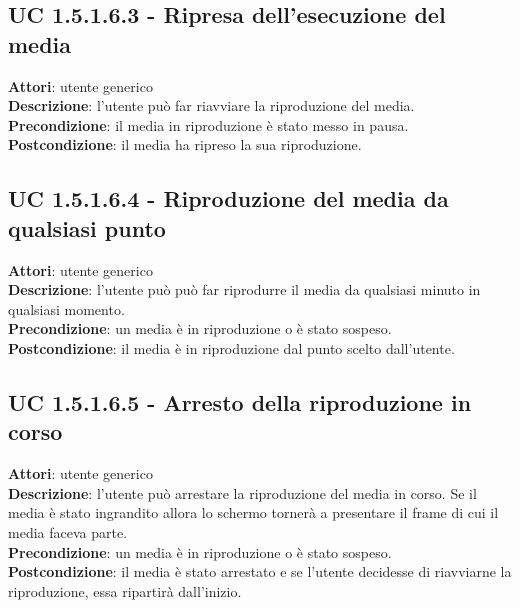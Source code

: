 	\subsection{UC 1.5.1.6.3 - Ripresa dell'esecuzione del media}{
		\label{uc1.5.1.6.3}
		\textbf{Attori}: utente generico \\
		\textbf{Descrizione}: l'utente può far riavviare la riproduzione del media. \\
		\textbf{Precondizione}: il media in riproduzione è stato messo in pausa.	\\
		\textbf{Postcondizione}: il media ha ripreso la sua riproduzione.	\\
	}
	\subsection{UC 1.5.1.6.4 - Riproduzione del media da qualsiasi punto}{
		\label{uc1.5.1.6.4}
		\textbf{Attori}: utente generico \\
		\textbf{Descrizione}: l'utente può può far riprodurre il media da qualsiasi minuto in qualsiasi momento. \\
		\textbf{Precondizione}: un media è in riproduzione o è stato sospeso.	\\
		\textbf{Postcondizione}: il media è in riproduzione dal punto scelto dall'utente.	\\
	}
	\subsection{UC 1.5.1.6.5 - Arresto della riproduzione in corso}{
		\label{uc1.5.1.6.5}
		\textbf{Attori}: utente generico \\
		\textbf{Descrizione}: l'utente può arrestare la riproduzione del media in corso. Se il media è stato ingrandito allora lo schermo tornerà a presentare il frame di cui il media faceva parte. \\
		\textbf{Precondizione}: un media è in riproduzione o è stato sospeso.	\\
		\textbf{Postcondizione}: il media è stato arrestato e se l'utente decidesse di riavviarne la riproduzione, essa ripartirà dall'inizio.	\\
	}
